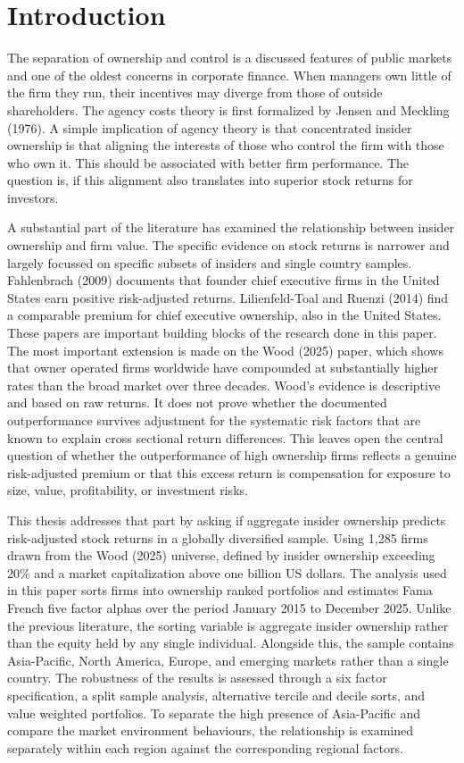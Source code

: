 
\section{Introduction}

The separation of ownership and control is a discussed features of public markets and one of the oldest concerns in corporate finance. When managers own little of the firm they run, their incentives may diverge from those of outside shareholders. The agency costs theory is first formalized by Jensen and Meckling (1976). A simple implication of agency theory is that concentrated insider ownership is that aligning the interests of those who control the firm with those who own it. This should be associated with better firm performance. The question is, if this alignment also translates into superior stock returns for investors.

A substantial part of the literature has examined the relationship between insider ownership and firm value. The specific evidence on stock returns is narrower and largely focussed on specific subsets of insiders and single country samples. Fahlenbrach (2009) documents that founder chief executive firms in the United States earn positive risk-adjusted returns. Lilienfeld-Toal and Ruenzi (2014) find a comparable premium for chief executive ownership, also in the United States. These papers are important building blocks of the research done in this paper. The most important extension is made on the Wood (2025) paper, which shows that owner operated firms worldwide have compounded at substantially higher rates than the broad market over three decades. Wood's evidence is descriptive and based on raw returns. It does not prove whether the documented outperformance survives adjustment for the systematic risk factors that are known to explain cross sectional return differences. This leaves open the central question of whether the outperformance of high ownership firms reflects a genuine risk-adjusted premium or that this excess return is compensation for exposure to size, value, profitability, or investment risks.

This thesis addresses that part by asking if aggregate insider ownership predicts risk-adjusted stock returns in a globally diversified sample. Using 1,285 firms drawn from the Wood (2025) universe, defined by insider ownership exceeding 20\% and a market capitalization above one billion US dollars. The analysis used in this paper sorts firms into ownership ranked portfolios and estimates Fama French five factor alphas over the period January 2015 to December 2025. Unlike the previous literature, the sorting variable is aggregate insider ownership rather than the equity held by any single individual. Alongside this, the sample contains Asia-Pacific, North America, Europe, and emerging markets rather than a single country. The robustness of the results is assessed through a six factor specification, a split sample analysis, alternative tercile and decile sorts, and value weighted portfolios. To separate the high presence of Asia-Pacific and compare the market environment behaviours, the relationship is examined separately within each region against the corresponding regional factors.

